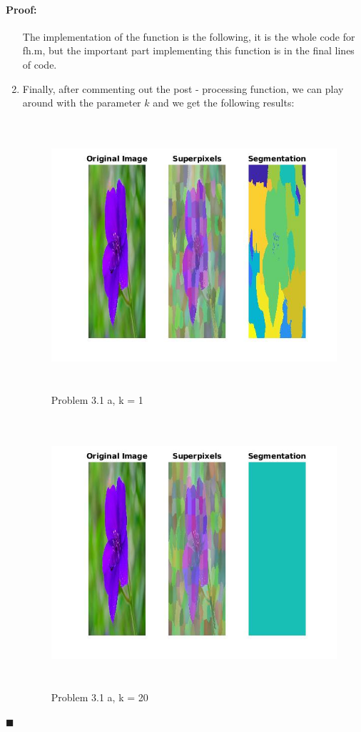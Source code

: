 \documentclass[12pt]{article}
\newenvironment{proof}{\paragraph{Proof: }}{\hfill$\blacksquare$}
\begin{document}
\begin{proof}
\begin{enumerate}
The implementation of the function is the following, it is the whole code for fh.m, but the important part implementing this function is in the final lines of code.



\item Finally, after commenting out the post - processing function, we can play around with the parameter $k$ and we get the following results:

\begin{figure}[!htbp]
\centering
\includegraphics[width=14cm,height = 10cm]{max_flower_1.jpg}
\caption{Problem 3.1 a, k = 1}
\end{figure}


\begin{figure}[!htbp]
\centering
\includegraphics[width=14cm,height = 10cm]{max_flower_20.jpg}
\caption{Problem 3.1 a, k = 20}
\end{figure}



\end{enumerate}
\end{proof}
\end{document}
